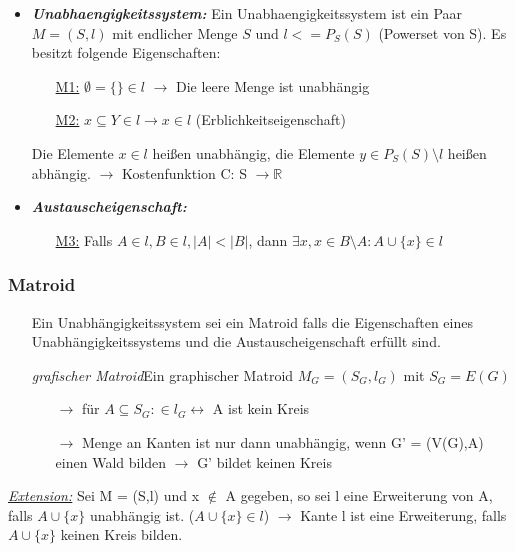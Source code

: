 \begin{itemize}
	\item \textbf{\textit{Unabhaengigkeitssystem:}} \newline Ein Unabhaengigkeitssystem ist ein Paar $M = (S,l)$ mit endlicher Menge $S$ und $l <= P_S(S)$ (Powerset von S). Es besitzt folgende Eigenschaften:
	\begin{itemize}
		\item[\underline{M1:}] $\emptyset = \{\} \in l$ $\rightarrow$ Die leere Menge ist unabhängig
		\item[\underline{M2:}] $x \subseteq Y \in l \rightarrow x \in l$ (Erblichkeitseigenschaft)
	\end{itemize}
	Die Elemente $x \in l$ heißen unabhängig, die Elemente $y \in P_S(S) \setminus l$ heißen abhängig. \newline
	$\rightarrow$ Kostenfunktion C: S $\rightarrow \mathbb{R}$ 
	\item \textbf{\textit{Austauscheigenschaft:}}
	\begin{itemize}
		\item [\underline{M3:}] Falls $A \in l, B \in l, |A| < |B|$, dann $\exists x, x \in B \setminus A: A \cup \{x\} \in l$
	\end{itemize}
\end{itemize}

\subsubsection{Matroid}
\begin{itemize}
	\item[] Ein Unabhängigkeitssystem sei ein Matroid falls die Eigenschaften eines Unabhängigkeitssystems und die Austauscheigenschaft erfüllt sind.
	\item[] \textit{grafischer Matroid}\newline Ein graphischer Matroid $M_G = (S_G,l_G)$ mit $S_G = E(G)$
	\begin{itemize}
		\item[$\rightarrow$] für $A \subseteq S_G: \in l_G \leftrightarrow$ A ist kein Kreis
		\item[$\rightarrow$] Menge an Kanten ist nur dann unabhängig, wenn G' = (V(G),A) einen Wald bilden $\rightarrow$ G' bildet keinen Kreis
	\end{itemize}
\end{itemize}

\underline{\textit{Extension:}} \newline Sei M = (S,l) und x $\notin$ A gegeben, so sei l eine Erweiterung von A, falls $A \cup \{x\}$ unabhängig ist. ($A \cup \{x\}\in l$) \newline  $\rightarrow$ Kante l ist eine Erweiterung, falls $A \cup \{x\}$ keinen Kreis bilden. \newline 

